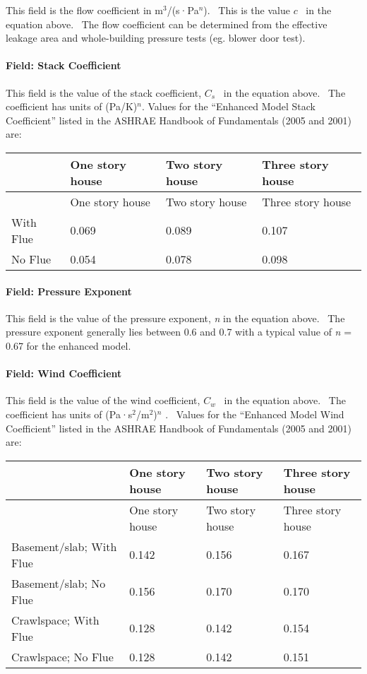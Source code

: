 This field is the flow coefficient in m\(^{3}\)/(s·Pa\(^{n}\)).~ This is the value \(c\) ~in the equation above.~ The flow coefficient can be determined from the effective leakage area and whole-building pressure tests (eg. blower door test).

\paragraph{Field: Stack Coefficient}\label{field-stack-coefficient-1}

This field is the value of the stack coefficient, \({C_s}\) ~in the equation above.~ The coefficient has units of (Pa/K)\(^{n}\). Values for the ``Enhanced Model Stack Coefficient'' listed in the ASHRAE Handbook of Fundamentals (2005 and 2001) are:

\begin{longtable}[c]{@{}llll@{}}
\toprule
~ & One story house & Two story house & Three story house \tabularnewline
\midrule
\endfirsthead

\toprule
~ & One story house & Two story house & Three story house \tabularnewline
\midrule
\endhead

With Flue & 0.069 & 0.089 & 0.107 \tabularnewline
No Flue & 0.054 & 0.078 & 0.098 \tabularnewline
\bottomrule
\end{longtable}

\paragraph{Field: Pressure Exponent}\label{field-pressure-exponent}

This field is the value of the pressure exponent, \emph{n} in the equation above.~ The pressure exponent generally lies between 0.6 and 0.7 with a typical value of \emph{n} = 0.67 for the enhanced model.

\paragraph{Field: Wind Coefficient}\label{field-wind-coefficient-1}

This field is the value of the wind coefficient, \({C_w}\) ~in the equation above.~ The coefficient has units of (Pa·s\(^{2}\)/m\(^{2}\))\(^{n}\) .~ Values for the ``Enhanced Model Wind Coefficient'' listed in the ASHRAE Handbook of Fundamentals (2005 and 2001) are:

\begin{longtable}[c]{p{1.5in}p{1.5in}p{1.5in}p{1.5in}}
\toprule
~ & One story house & Two story house & Three story house \tabularnewline
\midrule
\endfirsthead

\toprule
~ & One story house & Two story house & Three story house \tabularnewline
\midrule
\endhead

Basement/slab; With Flue & 0.142 & 0.156 & 0.167 \tabularnewline
Basement/slab; No Flue & 0.156 & 0.170 & 0.170 \tabularnewline
Crawlspace; With Flue & 0.128 & 0.142 & 0.154 \tabularnewline
Crawlspace; No Flue & 0.128 & 0.142 & 0.151 \tabularnewline
\bottomrule
\end{longtable}

